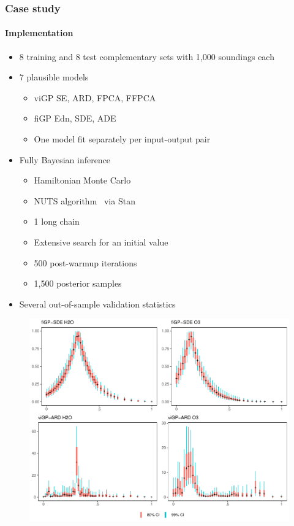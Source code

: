 \documentclass[handout]{snedecorbeamer}
\begin{document}
\begin{frame}
  \frametitle{Case study}
  \framesubtitle{Implementation}

  \begin{itemize}
  \item 8 training and 8 test complementary sets with 1,000 soundings each
  \item 7 plausible models
    \begin{itemize}
    \item viGP SE, ARD, FPCA, FFPCA
    \item fiGP Edn, SDE, ADE
    \item One model fit separately per input-output pair
    \end{itemize}
  \item Fully Bayesian inference
    \begin{itemize}
    \item Hamiltonian Monte Carlo~\citep[ch. 5]{brooks2011}
    \item NUTS algorithm~\citep{hoffman2014} via Stan~\citep{standevelopmentteam2021}
    \item 1 long chain~\citep{raftery1992}
    \item Extensive search for an initial value
    \item 500 post-warmup iterations
    \item 1,500 posterior samples
    \end{itemize}
  \item Several out-of-sample validation statistics
    \hyperlink{frm:validation}{}
  \end{itemize}
\end{frame}

\begin{frame}[c]
  \begin{figure}
    \centering
    \includegraphics[height=.95\textheight]{weights-examples-pressure.pdf}
  \end{figure}

\end{frame}
\end{document}
